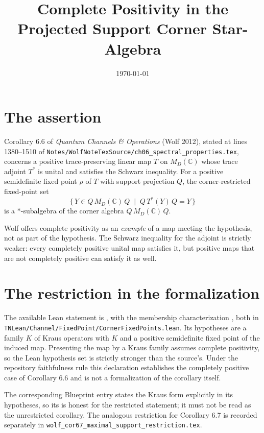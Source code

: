 \documentclass[11pt]{article}
\title{Complete Positivity in the Projected Support Corner Star-Algebra}
\author{}
\date{\today}
\begin{document}
\maketitle
{}

\section{The assertion}

Corollary 6.6 of \emph{Quantum Channels \& Operations} (Wolf 2012), stated at
lines 1380--1510 of \texttt{Notes/WolfNoteTexSource/ch06\_spectral\_properties.tex},
concerns a positive trace-preserving linear map $T$ on $M_D(\mathbb{C})$ whose trace
adjoint $T^{*}$ is unital and satisfies the Schwarz inequality. For a positive
semidefinite fixed point $\rho$ of $T$ with support projection $Q$, the corner-restricted
fixed-point set
\[
    \{\, Y \in Q\,M_D(\mathbb{C})\,Q \;\mid\; Q\,T^{*}(Y)\,Q = Y \,\}
\]
is a $*$-subalgebra of the corner algebra $Q\,M_D(\mathbb{C})\,Q$.

Wolf offers complete positivity as an \emph{example} of a map meeting the hypothesis,
not as part of the hypothesis. The Schwarz inequality for the adjoint is strictly weaker:
every completely positive unital map satisfies it, but positive maps that are not
completely positive can satisfy it as well.

\section{The restriction in the formalization}

The available Lean statement is , with the
membership characterization , both in
\texttt{TNLean/Channel/FixedPoint/CornerFixedPoints.lean}. Its hypotheses are a family
$K$ of Kraus operators with  $K$ and a positive semidefinite fixed point of
the induced map. Presenting the map by a Kraus family assumes complete positivity, so the
Lean hypothesis set is strictly stronger than the source's. Under the repository
faithfulness rule this declaration establishes the completely positive case of
Corollary 6.6 and is not a formalization of the corollary itself.

The corresponding Blueprint entry states the Kraus form explicitly in its hypotheses, so
its  is honest for the restricted statement; it must not be
read as the unrestricted corollary. The analogous restriction for Corollary 6.7 is
recorded separately in \texttt{wolf\_cor67\_maximal\_support\_restriction.tex}.
\end{document}
